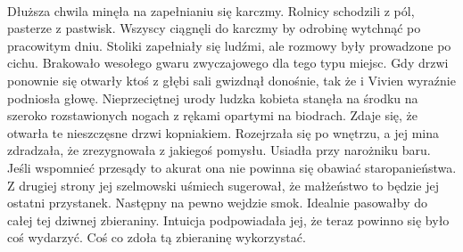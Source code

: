 \documentclass[10pt,twoside,twocolumn]{book}
\begin{document}
\paragraph{}
Dłuższa chwila minęła na zapełnianiu się karczmy. 
Rolnicy schodzili z pól, pasterze z pastwisk. 
Wszyscy ciągnęli do karczmy by odrobinę wytchnąć po pracowitym dniu. 
Stoliki zapełniały się ludźmi, ale rozmowy były prowadzone po cichu. 
Brakowało wesołego gwaru zwyczajowego dla tego typu miejsc. 
Gdy drzwi ponownie się otwarły ktoś z głębi sali gwizdnął donośnie, tak że i Vivien wyraźnie podniosła głowę. 
Nieprzeciętnej urody ludzka kobieta stanęła na środku na szeroko rozstawionych nogach z rękami opartymi na biodrach. 
Zdaje się, że otwarła te nieszczęsne drzwi kopniakiem. 
Rozejrzała się po wnętrzu, a jej mina zdradzała, że zrezygnowała z jakiegoś pomysłu. 
Usiadła przy narożniku baru. 
Jeśli wspomnieć przesądy to akurat ona nie powinna się obawiać staropanieństwa. 
Z drugiej strony jej szelmowski uśmiech sugerował, że małżeństwo to będzie jej ostatni przystanek.
Następny na pewno wejdzie smok. 
Idealnie pasowałby do całej tej dziwnej zbieraniny. 
Intuicja podpowiadała jej, że teraz powinno się było coś wydarzyć. 
Coś co zdoła tą zbieraninę wykorzystać.
\end{document}

